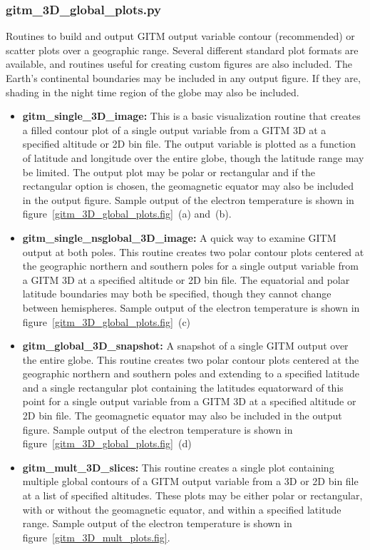 \subsubsection{gitm\_3D\_global\_plots.py}

Routines to build and output GITM output variable contour (recommended) or scatter plots over a geographic range.  Several different standard plot formats are available, and routines useful for creating custom figures are also included.  The Earth's continental boundaries may be included in any output figure.  If they are, shading in the night time region of the globe may also be included.

\begin{itemize}
\item[]{{\bf gitm\_single\_3D\_image:}  This is a basic visualization routine that creates a filled contour plot of a single output variable from a GITM 3D at a specified altitude or 2D bin file.  The output variable is plotted as a function of latitude and longitude over the entire globe, though the latitude range may be limited.  The output plot may be polar or rectangular and if the rectangular option is chosen, the geomagnetic equator may also be included in the output figure.  Sample output of the electron temperature is shown in figure~\ref{gitm_3D_global_plots.fig}~(a) and~(b).}
\item[]{{\bf gitm\_single\_nsglobal\_3D\_image:}  A quick way to examine GITM output at both poles.  This routine creates two polar contour plots centered at the geographic northern and southern poles for a single output variable from a GITM 3D at a specified altitude or 2D bin file.  The equatorial and polar latitude boundaries may both be specified, though they cannot change between hemispheres.  Sample output of the electron temperature is shown in figure~\ref{gitm_3D_global_plots.fig}~(c)}
\item[]{{\bf gitm\_global\_3D\_snapshot:}  A snapshot of a single GITM output over the entire globe.  This routine creates two polar contour plots centered at the geographic northern and southern poles and extending to a specified latitude and a single rectangular plot containing the latitudes equatorward of this point for a single output variable from a GITM 3D at a specified altitude or 2D bin file.  The geomagnetic equator may also be included in the output figure.  Sample output of the electron temperature is shown in figure~\ref{gitm_3D_global_plots.fig}~(d)}
\item[]{{\bf gitm\_mult\_3D\_slices:}  This routine creates a single plot containing multiple global contours of a GITM output variable from a 3D or 2D bin file at a list of specified altitudes.  These plots may be either polar or rectangular, with or without the geomagnetic equator, and within a specified latitude range.  Sample output of the electron temperature is shown in figure~\ref{gitm_3D_mult_plots.fig}.}
\end{itemize}

